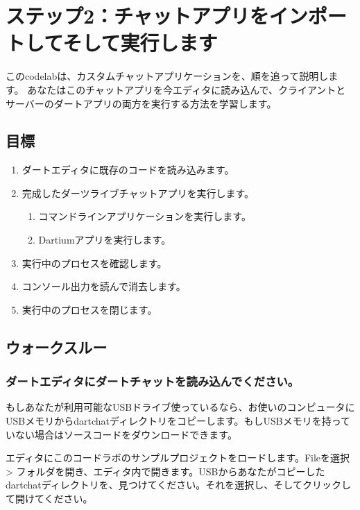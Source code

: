 \chapter*{ステップ2：チャットアプリをインポートしてそして実行します}
\addtocounter{chapter}{1}

このcodelabは、カスタムチャットアプリケーションを、順を追って説明します。
あなたはこのチャットアプリを今エディタに読み込んで、クライアントとサーバーのダートアプリの両方を実行する方法を学習します。

\section{目標}

\begin{enumerate}
\item ダートエディタに既存のコードを読み込みます。
\item 完成したダーツライブチャットアプリを実行します。
\begin{enumerate}
\item コマンドラインアプリケーションを実行します。
\item Dartiumアプリを実行します。
\end{enumerate}
\item 実行中のプロセスを確認します。
\item コンソール出力を読んで消去します。
\item 実行中のプロセスを閉じます。
\end{enumerate}

\section{ウォークスルー}

\subsection{ダートエディタにダートチャットを読み込んでください。}

もしあなたが利用可能なUSBドライブ使っているなら、お使いのコンピュータにUSBメモリからdartchatディレクトリをコピーします。もしUSBメモリを持っていない場合はソースコードをダウンロードできます。

エディタにこのコードラボのサンプルプロジェクトをロードします。Fileを選択 > フォルダを開き、エディタ内で開きます。USBからあなたがコピーしたdartchatディレクトリを、見つけてください。それを選択し、そしてクリックして開けてください。

